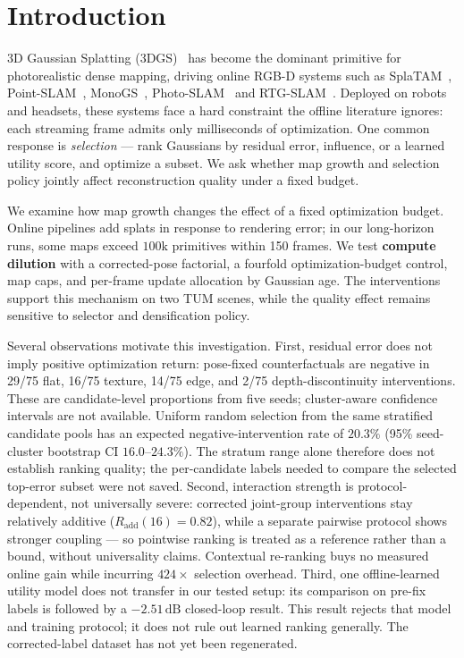 \documentclass[10pt,twocolumn,letterpaper]{article}
\begin{document}
\section{Introduction}
3D Gaussian Splatting (3DGS)~\cite{kerbl3Dgaussians} has become the dominant primitive for photorealistic dense mapping, driving online RGB-D systems such as SplaTAM~\cite{keetha2023splatam}, Point-SLAM~\cite{sandstrom2023pointslam}, MonoGS~\cite{matsuki2024gaussian}, Photo-SLAM~\cite{huang2024photoslam} and RTG-SLAM~\cite{peng2024rtgslam}.
Deployed on robots and headsets, these systems face a hard constraint the offline literature ignores: each streaming frame admits only milliseconds of optimization.
One common response is \textit{selection} --- rank Gaussians by residual error, influence, or a learned utility score, and optimize a subset.
We ask whether map growth and selection policy jointly affect reconstruction quality under a fixed budget.

We examine how map growth changes the effect of a fixed optimization budget. Online pipelines add splats in response to rendering error; in our long-horizon runs, some maps exceed $100\mathrm{k}$ primitives within 150 frames. We test \textbf{compute dilution} with a corrected-pose factorial, a fourfold optimization-budget control, map caps, and per-frame update allocation by Gaussian age. The interventions support this mechanism on two TUM scenes, while the quality effect remains sensitive to selector and densification policy.

Several observations motivate this investigation.
First, residual error does not imply positive optimization return: pose-fixed counterfactuals are negative in 29/75 flat, 16/75 texture, 14/75 edge, and 2/75 depth-discontinuity interventions. These are candidate-level proportions from five seeds; cluster-aware confidence intervals are not available.
Uniform random selection from the same stratified candidate pools has an expected negative-intervention rate of $20.3\%$ (95\% seed-cluster bootstrap CI $16.0$--$24.3\%$). The stratum range alone therefore does not establish ranking quality; the per-candidate labels needed to compare the selected top-error subset were not saved.
Second, interaction strength is protocol-dependent, not universally severe: corrected joint-group interventions stay relatively additive ($R_{\mathrm{add}}(16) = 0.82$), while a separate pairwise protocol shows stronger coupling --- so pointwise ranking is treated as a reference rather than a bound, without universality claims. Contextual re-ranking buys no measured online gain while incurring $424\times$ selection overhead.
Third, one offline-learned utility model does not transfer in our tested setup: its comparison on pre-fix labels is followed by a $-2.51\,\mathrm{dB}$ closed-loop result.
This result rejects that model and training protocol; it does not rule out learned ranking generally. The corrected-label dataset has not yet been regenerated.
\end{document}
